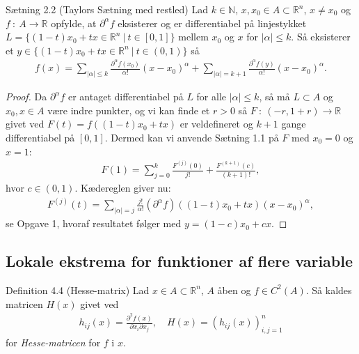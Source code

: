 \begin{boks}{Sætning 2.2 (Taylors Sætning med restled)}
  Lad $k \in \mathbb{N}$, $x,x_0 \in A \subset \mathbb{R}^n$, $x \neq x_0$ og $f \ : \ A \rightarrow \mathbb{R}$ opfylde, at $\partial^\alpha f$ eksisterer og er differentiabel på linjestykket $L = \{(1 - t)x_0 + tx \in \mathbb{R}^n \ | \ t \in [0,1]\}$ mellem $x_0$ og $x$ for $|\alpha| \leq k$.
  Så eksisterer et $y \in \{(1 - t)x_0 + tx \in \mathbb{R}^n \ | \ t \in (0,1)\}$ så
  \begin{align*}
    f(x) = \sum_{|\alpha| \leq k} \frac{\partial^\alpha f(x_0)}{\alpha!}(x - x_0)^\alpha + \sum_{|\alpha| = k + 1}\frac{\partial^\alpha f(y)}{\alpha!}(x - x_0)^\alpha.
  \end{align*}
\end{boks}
\begin{proof}
  Da $\partial^\alpha f$ er antaget differentiabel på $L$ for alle $|\alpha| \leq k$, så må $L \subset A$ og $x_0, x \in A$ være indre punkter, og vi kan finde et $r > 0$ så $F \ : \ (-r, 1 + r) \rightarrow \mathbb{R}$ givet ved $F(t) = f((1-t)x_0 + tx)$ er veldefineret og $k + 1$ gange differentiabel på $[0,1]$. Dermed kan vi anvende Sætning 1.1 på $F$ med $x_0 = 0$ og $x = 1$:
  \begin{align*}
    F(1) = \sum_{j = 0}^k \frac{F^{(j)}(0)}{j!} + \frac{F^{(k + 1)}(c)}{(k + 1)!},
  \end{align*}
  hvor $c \in (0,1)$. Kædereglen giver nu:
  \begin{align*}
    F^{(j)}(t) = \sum_{|\alpha| = j} \frac{j!}{\alpha!}(\partial^\alpha f)((1-t)x_0 + tx)(x - x_0)^\alpha,
  \end{align*}
  se Opgave 1, hvoraf resultatet følger med $y = (1 - c)x_0 + cx$.
\end{proof}

\subsection{Lokale ekstrema for funktioner af flere variable}
\begin{boks}{Definition 4.4 (Hesse-matrix)}
  Lad $x \in A \subset \mathbb{R}^n$, $A$ åben og $f \in C^2(A)$. Så kaldes matricen $H(x)$ givet ved
  \begin{align*}
    h_{ij}(x) = \frac{\partial^2 f(x)}{\partial x_i \partial x_j}, \quad
    H(x) = (h_{ij}(x))_{i,j = 1}^n
  \end{align*}
  for \textit{Hesse-matricen} for $f$ i $x$.
\end{boks}

